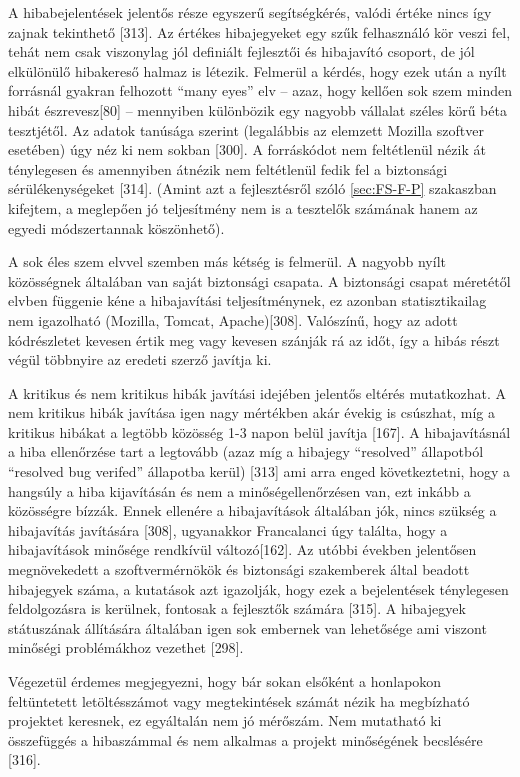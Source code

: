 \documentclass[12pt,magyar,a4paper,oneside]{scrreprt}
\begin{document}
A hibabejelentések jelentős része egyszerű segítségkérés, valódi értéke
nincs így zajnak tekinthető {[}313{]}. Az értékes hibajegyeket egy szűk
felhasználó kör veszi fel, tehát nem csak viszonylag jól definiált
fejlesztői és hibajavító csoport, de jól elkülönülő hibakereső halmaz is
létezik. Felmerül a kérdés, hogy ezek után a nyílt forrásnál gyakran
felhozott ``many eyes'' elv -- azaz, hogy kellően sok szem minden hibát
észrevesz{[}80{]} -- mennyiben különbözik egy nagyobb vállalat széles
körű béta tesztjétől. Az adatok tanúsága szerint (legalábbis az elemzett
Mozilla szoftver esetében) úgy néz ki nem sokban {[}300{]}. A
forráskódot nem feltétlenül nézik át ténylegesen és amennyiben átnézik
nem feltétlenül fedik fel a biztonsági sérülékenységeket {[}314{]}.
(Amint azt a fejlesztésről szóló \ref{sec:FS-F-P} szakaszban kifejtem, a
meglepően jó teljesítmény nem is a tesztelők számának hanem az egyedi
módszertannak köszönhető).

A sok éles szem elvvel szemben más kétség is felmerül. A nagyobb nyílt
közösségnek általában van saját biztonsági csapata. A biztonsági csapat
méretétől elvben függenie kéne a hibajavítási teljesítménynek, ez
azonban statisztikailag nem igazolható (Mozilla, Tomcat,
Apache){[}308{]}. Valószínű, hogy az adott kódrészletet kevesen értik
meg vagy kevesen szánják rá az időt, így a hibás részt végül többnyire
az eredeti szerző javítja ki.

A kritikus és nem kritikus hibák javítási idejében jelentős eltérés
mutatkozhat. A nem kritikus hibák javítása igen nagy mértékben akár
évekig is csúszhat, míg a kritikus hibákat a legtöbb közösség 1-3 napon
belül javítja {[}167{]}. A hibajavításnál a hiba ellenőrzése tart a
legtovább (azaz míg a hibajegy ``resolved'' állapotból ``resolved bug
verifed'' állapotba kerül) {[}313{]} ami arra enged következtetni, hogy
a hangsúly a hiba kijavításán és nem a minőségellenőrzésen van, ezt
inkább a közösségre bízzák. Ennek ellenére a hibajavítások általában
jók, nincs szükség a hibajavítás javítására {[}308{]}, ugyanakkor
Francalanci úgy találta, hogy a hibajavítások minősége rendkívül
változó{[}162{]}. Az utóbbi években jelentősen megnövekedett a
szoftvermérnökök és biztonsági szakemberek által beadott hibajegyek
száma, a kutatások azt igazolják, hogy ezek a bejelentések ténylegesen
feldolgozásra is kerülnek, fontosak a fejlesztők számára {[}315{]}. A
hibajegyek státuszának állítására általában igen sok embernek van
lehetősége ami viszont minőségi problémákhoz vezethet {[}298{]}.

Végezetül érdemes megjegyezni, hogy bár sokan elsőként a honlapokon
feltüntetett letöltésszámot vagy megtekintések számát nézik ha
megbízható projektet keresnek, ez egyáltalán nem jó mérőszám. Nem
mutatható ki összefüggés a hibaszámmal és nem alkalmas a projekt
minőségének becslésére {[}316{]}.
\end{document}
